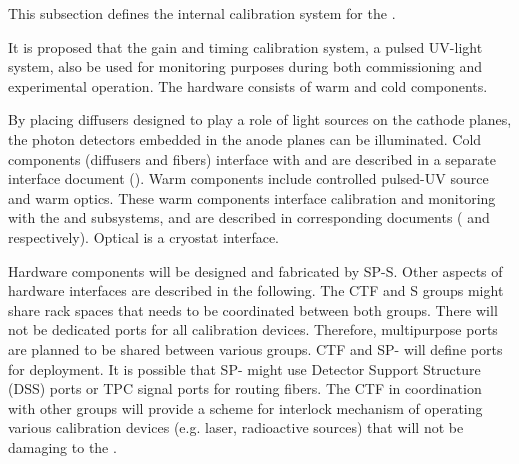 

This subsection defines the internal calibration system for the \single {}. 

It is proposed that the \single {} gain and timing calibration system, a pulsed UV-light system, also be used for  monitoring purposes during both commissioning and experimental operation. The hardware consists of warm and cold components.  

By placing diffusers designed to play a role of light sources on the cathode planes, the photon detectors embedded in the anode planes can be illuminated.
Cold components (diffusers and fibers) interface with  and are described in a separate interface document (). 
Warm components include controlled pulsed-UV source and warm optics. These warm components interface calibration and monitoring  with the  and  subsystems, and are described in corresponding documents ( and  respectively).
Optical \fdth is a cryostat interface. 

Hardware components will be designed and fabricated by SP-S. Other aspects of hardware interfaces are described in the following. The CTF and S groups might share rack spaces that needs to be coordinated between both groups. There will not be dedicated ports for all calibration devices. Therefore, multipurpose ports are planned to be shared between various groups. CTF and SP- will define ports for deployment. It is possible that SP- might use Detector Support Structure (DSS) ports or TPC signal ports for routing fibers. The CTF in coordination with other groups will provide a scheme for interlock mechanism of operating various calibration devices (e.g. laser, radioactive sources) that will not be damaging to the . 


